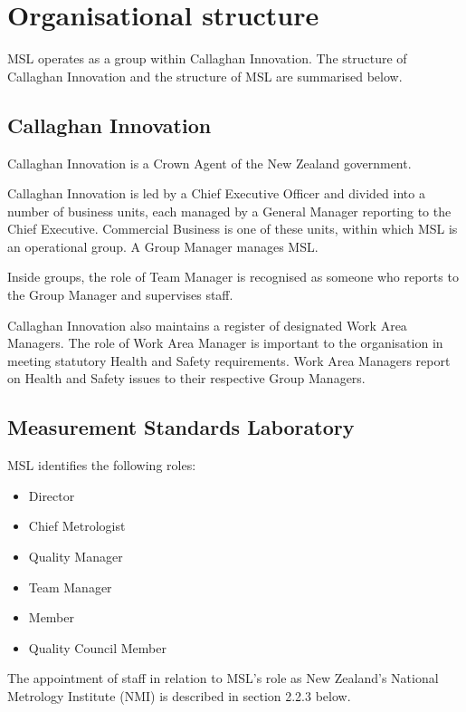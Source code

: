 \section{Organisational structure}
\label{s:organisation}
MSL operates as a group within Callaghan Innovation. The structure of Callaghan Innovation and the structure of MSL are summarised below.

\subsection{Callaghan Innovation}
Callaghan Innovation is a Crown Agent of the New Zealand government. 

Callaghan Innovation is led by a Chief Executive Officer and divided into a number of business units, each managed by a General Manager reporting to the Chief Executive. Commercial Business is one of these units, within which MSL is an operational group. A Group Manager manages MSL. 

Inside groups, the role of Team Manager is recognised as someone who reports to the Group Manager and supervises staff. 

Callaghan Innovation also maintains a register of designated Work Area Managers. The role of Work Area Manager is important to the organisation in meeting statutory Health and Safety requirements. 
Work Area Managers report on Health and Safety issues to their respective Group Managers.

\subsection{Measurement Standards Laboratory}
MSL identifies the following roles:
\begin{itemize}
\item	Director
\item	Chief Metrologist
\item	Quality Manager
\item	Team Manager
\item	Member
\item	Quality Council Member
\end{itemize}
The appointment of staff in relation to MSL's role as New Zealand's National Metrology Institute (NMI) is described in section 2.2.3 below.
